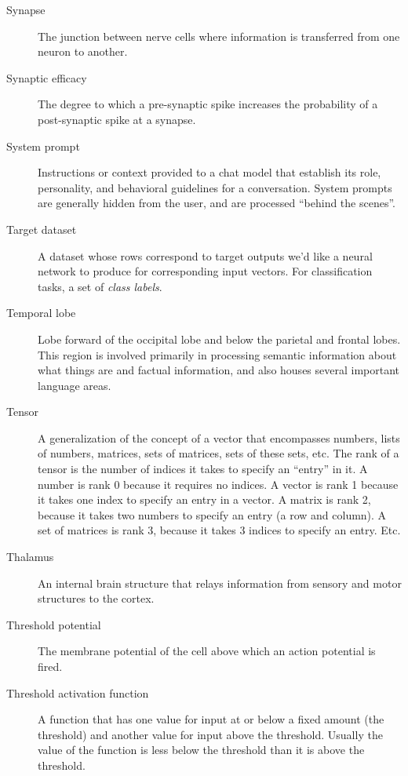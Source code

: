 \begin{description}

\item[Synapse] The junction between nerve cells where information is transferred from one neuron to another.

\item[Synaptic efficacy] The degree to which a pre-synaptic spike increases the probability of a post-synaptic spike at a synapse.

\item[System prompt] Instructions or context provided to a chat model that establish its role, personality, and behavioral guidelines for a conversation. System prompts are generally hidden from the user, and are processed ``behind the scenes''. 

\item[Target dataset] A dataset whose rows correspond to target outputs we'd like a neural network to produce for corresponding input vectors. For classification tasks, a set of \emph{class labels}.

\item[Temporal lobe] Lobe forward of the occipital lobe and below the parietal and frontal lobes. This region is involved primarily in processing semantic information about what things are and factual information, and also houses several important language areas.

\item[Tensor] A generalization of the concept of a vector that encompasses numbers, lists of numbers, matrices, sets of matrices, sets of these sets, etc. The rank of a tensor is the number of indices it takes to specify an ``entry'' in it.  A number is rank 0 because it requires no indices. A vector is rank 1 because it takes one index to specify an entry in a vector. A matrix is rank 2, because it takes two numbers to specify an entry (a row and column). A set of matrices is rank 3, because it takes 3 indices to specify an entry. Etc.

\item[Thalamus] An internal brain structure that relays information from sensory and motor structures to the cortex.

\item[Threshold potential] The membrane potential of the cell above which an action potential is fired. 

\item[Threshold activation function] A function that has one value for  input at or below a fixed amount (the threshold) and another value for input above the threshold. Usually the value of the function is less below the  threshold than it is above the threshold.


\end{description}
